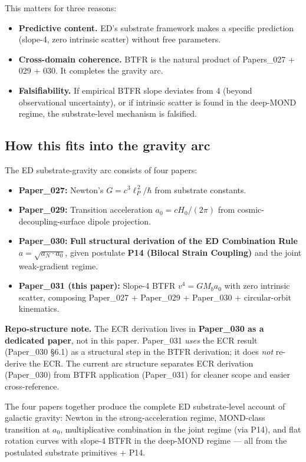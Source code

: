 \documentclass[11pt,a4paper]{article}
\begin{document}
This matters for three reasons:

\begin{itemize}[noitemsep]
\item \textbf{Predictive content.} ED's substrate framework makes a specific prediction (slope-4, zero intrinsic scatter) without free parameters.
\item \textbf{Cross-domain coherence.} BTFR is the natural product of Papers\_027 + 029 + 030. It completes the gravity arc.
\item \textbf{Falsifiability.} If empirical BTFR slope deviates from 4 (beyond observational uncertainty), or if intrinsic scatter is found in the deep-MOND regime, the substrate-level mechanism is falsified.
\end{itemize}

\subsection{How this fits into the gravity arc}

The ED substrate-gravity arc consists of four papers:

\begin{itemize}[noitemsep]
\item \textbf{Paper\_027:} Newton's $G = c^3\ell_P^{\,2}/\hbar$ from substrate constants.
\item \textbf{Paper\_029:} Transition acceleration $a_0 = cH_0/(2\pi)$ from cosmic-decoupling-surface dipole projection.
\item \textbf{Paper\_030:} \textbf{Full structural derivation of the ED Combination Rule $a = \sqrt{a_N \cdot a_0}$}, given postulate \textbf{P14 (Bilocal Strain Coupling)} and the joint weak-gradient regime.
\item \textbf{Paper\_031 (this paper):} Slope-4 BTFR $v^4 = GM_b a_0$ with zero intrinsic scatter, composing Paper\_027 + Paper\_029 + Paper\_030 + circular-orbit kinematics.
\end{itemize}

\textbf{Repo-structure note.} The ECR derivation lives in \textbf{Paper\_030 as a dedicated paper}, not in this paper. Paper\_031 \emph{uses} the ECR result (Paper\_030 \S6.1) as a structural step in the BTFR derivation; it does \emph{not} re-derive the ECR. The current arc structure separates ECR derivation (Paper\_030) from BTFR application (Paper\_031) for cleaner scope and easier cross-reference.

The four papers together produce the complete ED substrate-level account of galactic gravity: Newton in the strong-acceleration regime, MOND-class transition at $a_0$, multiplicative combination in the joint regime (via P14), and flat rotation curves with slope-4 BTFR in the deep-MOND regime --- all from the postulated substrate primitives + P14.
\end{document}
